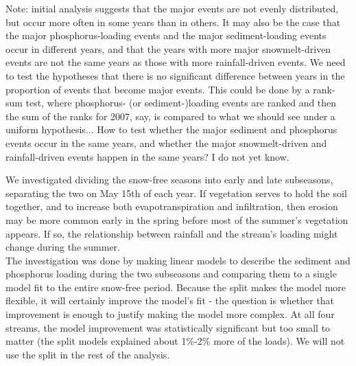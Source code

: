 \documentclass[10pt]{article}
\begin{document}
Note: initial analysis suggests that the major events are not evenly distributed, but occur more often in some years than in others. It may also be the case that the major phosphorus-loading events and the major sediment-loading events occur in different years, and that the years with more major snowmelt-driven events are not the same years as those with more rainfall-driven events. We need to test the hypotheses that there is no significant difference between years in the proportion of events that become major events. This could be done by a rank-sum test, where phosphorus- (or sediment-)loading events are ranked and then the sum of the ranks for 2007, say, is compared to what we should see under a uniform hypothesis... How to test whether the major sediment and phosphorus events occur in the same years, and whether the major snowmelt-driven and rainfall-driven events happen in the same years? I do not yet know.

We investigated dividing the snow-free seasons into early and late subseasons, separating the two on May 15th of each year. If vegetation serves to hold the soil together, and to increase both evapotranspiration and infiltration, then erosion may be more common early in the spring before most of the summer's vegetation appears. If so, the relationship between rainfall and the stream's loading might change during the summer.\\

The investigation was done by making linear models to describe the sediment and phosphorus loading during the two subseasons and comparing them to a single model fit to the entire snow-free period. Because the split makes the model more flexible, it will certainly improve the model's fit - the question is whether that improvement is enough to justify making the model more complex. At all four streams, the model improvement was statistically significant but too small to matter (the split models explained about 1\%-2\% more of the loads). We will not use the split in the rest of the analysis.\\
\end{document}
